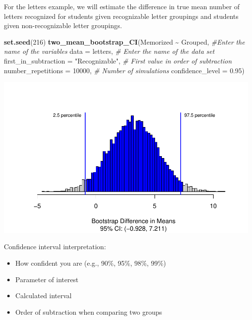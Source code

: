 \documentclass[
]{report}
\newenvironment{Shaded}{\begin{snugshade}}{\end{snugshade}}
\newcommand{\AttributeTok}[1]{\textcolor[rgb]{0.13,0.29,0.53}{#1}}
\newcommand{\CommentTok}[1]{\textcolor[rgb]{0.56,0.35,0.01}{\textit{#1}}}
\newcommand{\DecValTok}[1]{\textcolor[rgb]{0.00,0.00,0.81}{#1}}
\newcommand{\FloatTok}[1]{\textcolor[rgb]{0.00,0.00,0.81}{#1}}
\newcommand{\FunctionTok}[1]{\textcolor[rgb]{0.13,0.29,0.53}{\textbf{#1}}}
\newcommand{\NormalTok}[1]{#1}
\newcommand{\SpecialCharTok}[1]{\textcolor[rgb]{0.81,0.36,0.00}{\textbf{#1}}}
\newcommand{\StringTok}[1]{\textcolor[rgb]{0.31,0.60,0.02}{#1}}
\begin{document}
For the letters example, we will estimate the difference in true mean number of letters recognized for students given recognizable letter groupings and students given non-recognizable letter groupings.

\begin{Shaded}
\begin{Highlighting}[]
\FunctionTok{set.seed}\NormalTok{(}\DecValTok{216}\NormalTok{)}
\FunctionTok{two\_mean\_bootstrap\_CI}\NormalTok{(Memorized }\SpecialCharTok{\textasciitilde{}}\NormalTok{ Grouped, }\CommentTok{\#Enter the name of the variables}
                      \AttributeTok{data =}\NormalTok{ letters,  }\CommentTok{\# Enter the name of the data set}
                      \AttributeTok{first\_in\_subtraction =} \StringTok{"Recognizable"}\NormalTok{, }\CommentTok{\# First value in order of subtraction}
                      \AttributeTok{number\_repetitions =} \DecValTok{10000}\NormalTok{,  }\CommentTok{\# Number of simulations}
                      \AttributeTok{confidence\_level =} \FloatTok{0.95}\NormalTok{)}
\end{Highlighting}
\end{Shaded}

\begin{center}\includegraphics[width=0.7\linewidth]{12-VN12-1ofeach_files/figure-latex/unnamed-chunk-4-1} \end{center}

Confidence interval interpretation:

\begin{itemize}
\item
  How confident you are (e.g., 90\%, 95\%, 98\%, 99\%)
\item
  Parameter of interest
\item
  Calculated interval
\item
  Order of subtraction when comparing two groups
\end{itemize}

\vspace{0.8in}
\end{document}
